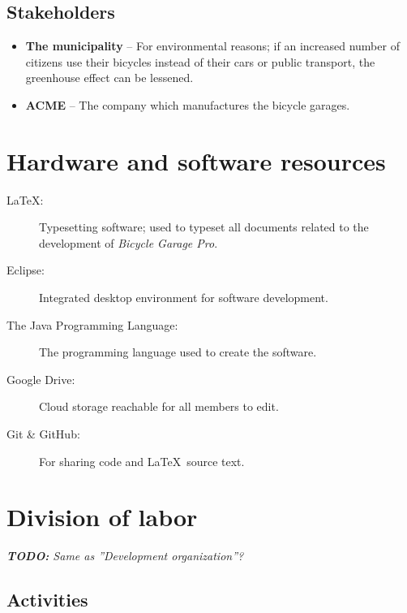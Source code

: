 \documentclass[12pt,titlepage]{article}
\begin{document}
\subsection{Stakeholders}

\begin{itemize}
	\item \textbf{The municipality} -- For environmental reasons; if an
		increased number of citizens use their bicycles instead of their
		cars or public transport, the greenhouse effect can be lessened.
	\item \textbf{ACME} -- The company which manufactures the bicycle
		garages.
\end{itemize}


\section{Hardware and software resources}
\label{sec:hardware-and-software-resources}

\begin{description}
	\item[\LaTeX:] Typesetting software; used to typeset all documents
		related to the development of \textit{Bicycle Garage Pro}.
	\item[Eclipse:] Integrated desktop environment for software development.
	\item[The Java Programming Language:] The programming language used to
		create the software.
	\item[Google Drive:] Cloud storage reachable for all members to edit.
	\item[Git \& GitHub:] For sharing code and \LaTeX~source text.
\end{description}


\section{Division of labor}

\textit{\textbf{TODO:} Same as ''Development organization''?} \\

\subsection{Activities}
\end{document}
